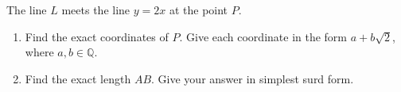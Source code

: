 \documentclass[12pt, twoside]{article}
\begin{document}
\begin{enumerate}[itemsep=0.15cm]
The line $L$ meets the line $y = 2x$ at the point $P$.

\begin{enumerate}[itemsep=0.1cm]
  \item[(d)] Find the exact coordinates of $P$. Give each coordinate in
  the form $a + b\sqrt{2}$, where $a, b \in \mathbb{Q}$.
  \item[(e)] Find the exact length $AB$. Give your answer in simplest
  surd form.
\end{enumerate}


\end{enumerate}
\end{document}
